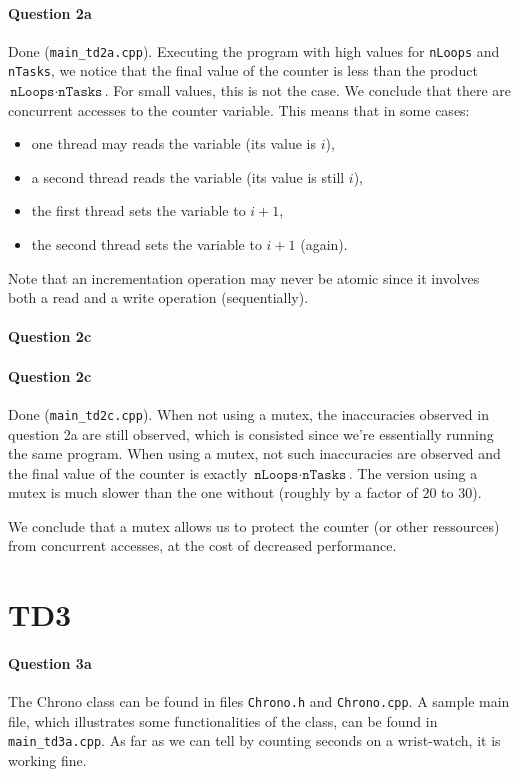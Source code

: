 \documentclass[a4paper,oneside,11pt]{article}
\begin{document}
\paragraph{Question 2a} Done (\texttt{main\_td2a.cpp}). Executing the program with high values for \texttt{nLoops} and \texttt{nTasks}, we notice that the final value of the counter is less than the product $\texttt{nLoops}\cdot\texttt{nTasks}$. For small values, this is not the case. We conclude that there are concurrent accesses to the counter variable. This means that in some cases:
\begin{itemize}
  \item  one thread may reads the variable (its value is $i$),
  \item a second thread reads the variable (its value is still $i$),
  \item the first thread sets the variable to $i+1$,
  \item the second thread sets the variable to $i+1$ (again).
\end{itemize}

Note that an incrementation operation may never be atomic since it involves both a read and a write operation (sequentially).

\paragraph{Question 2c}

\paragraph{Question 2c} Done (\texttt{main\_td2c.cpp}). When not using a mutex, the inaccuracies observed in question 2a are still observed, which is consisted since we're essentially running the same program. When using a mutex, not such inaccuracies are observed and the final value of the counter is exactly $\texttt{nLoops}\cdot\texttt{nTasks}$. The version using a mutex is much slower than the one without (roughly by a factor of 20 to 30).

We conclude that a mutex allows us to protect the counter (or other ressources) from concurrent accesses, at the cost of decreased performance.

\section*{TD3}
\paragraph{Question 3a} The Chrono class can be found in files \texttt{Chrono.h} and \texttt{Chrono.cpp}. A sample main file, which illustrates some functionalities of the class, can be found in \texttt{main\_td3a.cpp}. As far as we can tell by counting seconds on a wrist-watch, it is working fine.
\end{document}
